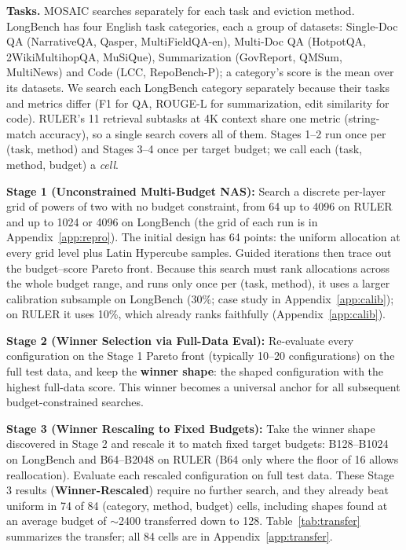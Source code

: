 \documentclass[11pt]{article}
\begin{document}
\textbf{Tasks.}\label{sec:method-tasks} MOSAIC searches separately for each task and eviction method. LongBench has four English task categories, each a group of datasets: Single-Doc QA (NarrativeQA, Qasper, MultiFieldQA-en), Multi-Doc QA (HotpotQA, 2WikiMultihopQA, MuSiQue), Summarization (GovReport, QMSum, MultiNews) and Code (LCC, RepoBench-P); a category's score is the mean over its datasets. We search each LongBench category separately because their tasks and metrics differ (F1 for QA, ROUGE-L for summarization, edit similarity for code). RULER's 11 retrieval subtasks at 4K context share one metric (string-match accuracy), so a single search covers all of them. Stages 1--2 run once per (task, method) and Stages 3--4 once per target budget; we call each (task, method, budget) a \emph{cell}.

\textbf{Stage 1 (Unconstrained Multi-Budget NAS):} Search a discrete per-layer grid of powers of two with no budget constraint, from 64 up to 4096 on RULER and up to 1024 or 4096 on LongBench (the grid of each run is in Appendix~\ref{app:repro}). The initial design has 64 points: the uniform allocation at every grid level plus Latin Hypercube samples. Guided iterations then trace out the budget--score Pareto front. Because this search must rank allocations across the whole budget range, and runs only once per (task, method), it uses a larger calibration subsample on LongBench (30\%; case study in Appendix~\ref{app:calib}); on RULER it uses 10\%, which already ranks faithfully (Appendix~\ref{app:calib}).

\textbf{Stage 2 (Winner Selection via Full-Data Eval):} Re-evaluate every configuration on the Stage 1 Pareto front (typically 10--20 configurations) on the full test data, and keep the \textbf{winner shape}: the shaped configuration with the highest full-data score. This winner becomes a universal anchor for all subsequent budget-constrained searches.



\textbf{Stage 3 (Winner Rescaling to Fixed Budgets):} Take the winner shape discovered in Stage 2 and rescale it to match fixed target budgets: B128--B1024 on LongBench and B64--B2048 on RULER (B64 only where the floor of 16 allows reallocation). Evaluate each rescaled configuration on full test data. These Stage 3 results (\textbf{Winner-Rescaled}) require no further search, and they already beat uniform in 74 of 84 (category, method, budget) cells, including shapes found at an average budget of $\sim$2400 transferred down to 128. Table~\ref{tab:transfer} summarizes the transfer; all 84 cells are in Appendix~\ref{app:transfer}.
\end{document}
